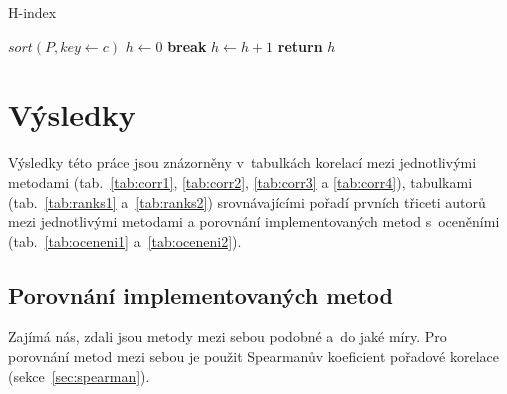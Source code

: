 \documentclass{bakalarka}
\begin{document}
\begin{center}
\begin{minipage}{\textwidth}
\begin{algorithm}[H]
	\caption{H-index}
		\label{alg:hindex}

	\begin{algorithmic}[1]
	\Statex
		\State $sort(P, key \gets c)$
		\State $h \gets 0$
				\State \textbf{break}
			\EndIf
			\State $h \gets h + 1$
		\EndFor
		\State \textbf{return} $h$
	\EndFunction
	\end{algorithmic}
\end{algorithm}
\end{minipage}
\end{center}
\mbox{}








\chapter{Výsledky}
Výsledky této práce jsou znázorněny v~tabulkách korelací mezi jednotlivými
metodami (tab.~\ref{tab:corr1}, \ref{tab:corr2}, \ref{tab:corr3} a
\ref{tab:corr4}), tabulkami (tab.~\ref{tab:ranks1} a~\ref{tab:ranks2})
srovnávajícími pořadí prvních třiceti autorů mezi jednotlivými metodami a
porovnání implementovaných metod s~oceněními (tab.~\ref{tab:oceneni1}
a~\ref{tab:oceneni2}).


\section{Porovnání implementovaných metod}
Zajímá nás, zdali jsou metody mezi sebou podobné a~do jaké míry. Pro porovnání
metod mezi sebou je použit Spearmanův koeficient pořadové korelace
(sekce~\ref{sec:spearman}).
\end{document}
